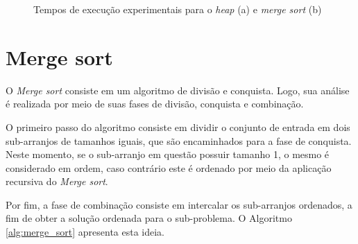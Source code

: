 \documentclass[12pt]{article}
\begin{document}
\begin{figure}[!h]%
    \caption{Tempos de execução experimentais para o \textit{heap} (a) e \textit{merge sort} (b)}%
\end{figure}





\section{Merge sort}

O \textit{Merge sort} consiste em um algoritmo de divisão e conquista. Logo, sua análise é realizada por meio de suas fases de divisão, conquista e combinação.

O primeiro passo do algoritmo consiste em dividir o conjunto de entrada em dois sub-arranjos de tamanhos iguais, que são encaminhados para a fase de conquista. Neste momento, se o sub-arranjo em questão possuir tamanho 1, o mesmo é considerado em ordem, caso contrário este é ordenado por meio da aplicação recursiva do \textit{Merge sort}.

Por fim, a fase de combinação consiste em intercalar os sub-arranjos ordenados, a fim de obter a solução ordenada para o sub-problema. O Algoritmo \ref{alg:merge_sort} apresenta esta ideia.
\end{document}

